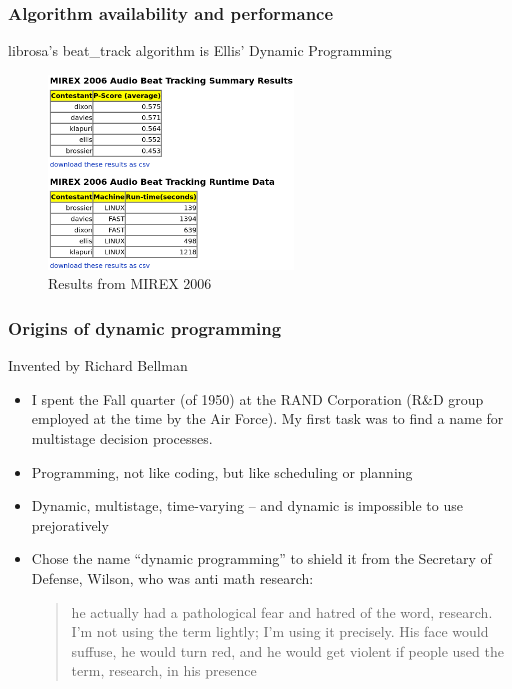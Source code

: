 \documentclass{beamer}
\begin{document}
\begin{frame}
	\frametitle{Algorithm availability and performance}
	librosa's beat\_track algorithm is Ellis' Dynamic Programming\\
	\begin{figure}
		\includegraphics[width=6.5cm]{./mirex2006.png}
		\caption{Results from MIREX 2006}
	\end{figure}
\end{frame}

\begin{frame}
	\frametitle{Origins of dynamic programming}
	Invented by Richard Bellman
	\begin{itemize}
		\item
			I spent the Fall quarter (of 1950) at the RAND Corporation (R\&D group employed at the time by the Air Force). My first task was to find a name for multistage decision processes.
		\item
			Programming, not like coding, but like scheduling or planning
		\item
			Dynamic, multistage, time-varying -- and dynamic is impossible to use prejoratively
		\item
			Chose the name ``dynamic programming'' to shield it from the Secretary of Defense, Wilson, who was anti math research:
			\begin{quote}
			he actually had a pathological fear and hatred of the word, research. I’m not using the term lightly; I'm using it precisely. His face would suffuse, he would turn red, and he would get violent if people used the term, research, in his presence
			\end{quote}
	\end{itemize}
\end{frame}
\end{document}
